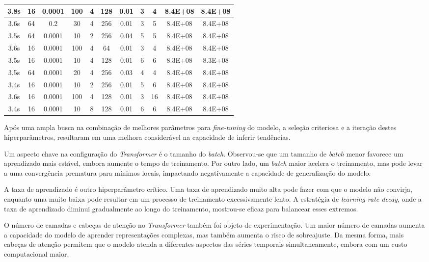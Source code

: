 \begin{longtable}{|c|c|c|c|c|c|c|c|c|c|c|}
3.8s & 16 & 0.0001 & 100 & 4 & 128 & 0.01 & 3 & 4 & 8.4E+08 & 8.4E+08 \\ \hline
3.6s & 64 & 0.2 & 30 & 4 & 256 & 0.01 & 3 & 5 & 8.4E+08 & 8.4E+08 \\ \hline
3.5s & 64 & 0.0001 & 10 & 2 & 256 & 0.04 & 5 & 5 & 8.4E+08 & 8.4E+08 \\ \hline
3.6s & 16 & 0.0001 & 100 & 4 & 64 & 0.01 & 3 & 4 & 8.4E+08 & 8.4E+08 \\ \hline
3.5s & 16 & 0.0001 & 10 & 4 & 128 & 0.01 & 6 & 6 & 8.3E+08 & 8.3E+08 \\ \hline
3.5s & 64 & 0.0001 & 20 & 4 & 256 & 0.03 & 4 & 4 & 8.4E+08 & 8.4E+08 \\ \hline
3.4s & 16 & 0.0001 & 10 & 2 & 256 & 0.01 & 5 & 6 & 8.4E+08 & 8.4E+08 \\ \hline
3.6s & 16 & 0.0001 & 100 & 4 & 128 & 0.01 & 3 & 16 & 8.4E+08 & 8.4E+08 \\ \hline
3.4s & 16 & 0.0001 & 10 & 8 & 128 & 0.01 & 6 & 6 & 8.4E+08 & 8.4E+08 \\ \hline
\end{longtable}


Após uma ampla busca na combinação de melhores parâmetros para \textit{fine-tuning} do modelo, a seleção criteriosa e a iteração destes hiperparâmetros, resultaram em uma melhora considerável na capacidade de inferir tendências. 

Um aspecto chave na configuração do \textit{Transformer} é o tamanho do \textit{batch}. Observou-se que um tamanho de \textit{batch} menor favorece um aprendizado mais estável, embora aumente o tempo de treinamento. Por outro lado, um \textit{batch} maior acelera o treinamento, mas pode levar a uma convergência prematura para mínimos locais, impactando negativamente a capacidade de generalização do modelo.

A taxa de aprendizado é outro hiperparâmetro crítico. Uma taxa de aprendizado muito alta pode fazer com que o modelo não convirja, enquanto uma muito baixa pode resultar em um processo de treinamento excessivamente lento. A estratégia de \textit{learning rate decay}, onde a taxa de aprendizado diminui gradualmente ao longo do treinamento, mostrou-se eficaz para balancear esses extremos.

O número de camadas e cabeças de atenção no \textit{Transformer} também foi objeto de experimentação. Um maior número de camadas aumenta a capacidade do modelo de aprender representações complexas, mas também aumenta o risco de sobreajuste. Da mesma forma, mais cabeças de atenção permitem que o modelo atenda a diferentes aspectos das séries temporais simultaneamente, embora com um custo computacional maior.

